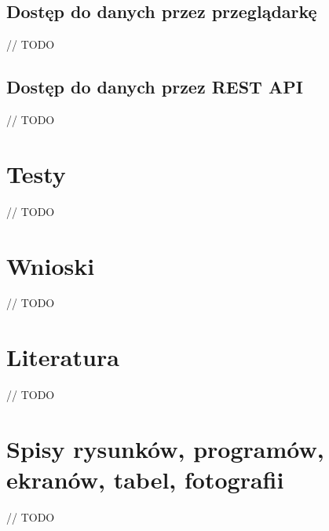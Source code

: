 \documentclass[12pt,a4paper]{article}
\begin{document}
\subsection{Dostęp do danych przez przeglądarkę}
// TODO

\subsection{Dostęp do danych przez REST API}
// TODO

\section{Testy}
// TODO

\section{Wnioski}
// TODO

\section{Literatura}
// TODO

\section{Spisy rysunków, programów, ekranów, tabel, fotografii}
// TODO
\end{document}
